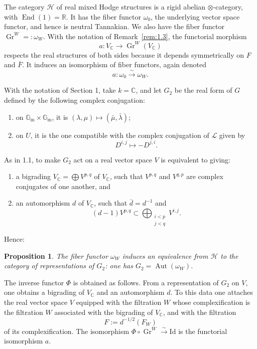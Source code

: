 \documentclass[12pt,a4paper]{article}
\theoremstyle{plain}
\newtheorem{proposition}[lemma]{Proposition}
\theoremstyle{definition}
\DeclareMathOperator{\Gr}{Gr}
\DeclareMathOperator{\Aut}{Aut}
\DeclareMathOperator{\End}{End}
\newcommand{\Gm}{\mathbb{G}_\mathrm{m}}
\newcommand{\C}{\mathbb{C}}
\newcommand{\R}{\mathbb{R}}
\begin{document}
The category $\mathscr H$ of real mixed Hodge structures is a rigid abelian $\otimes$-category, with $\End(1)=\R$. It has the fiber functor $\omega_0$, the underlying vector space functor, and hence is neutral Tannakian. We also have the fiber functor $\Gr^W=:\omega_W$. With the notation of Remark~\ref{rem:1.3}, the functorial morphism
\[
a:V_\C\longrightarrow \Gr^W(V_\C)
\]
respects the real structures of both sides because it depends symmetrically on $F$ and $\bar F$. It induces an isomorphism of fiber functors, again denoted
\[
a:\omega_0\xrightarrow{\sim}\omega_W.
\]

With the notation of Section 1, take $k=\C$, and let $G_2$ be the real form of $G$ defined by the following complex conjugation:
\begin{enumerate}[label=\alph*)]
\item on $\Gm\times\Gm$, it is $(\lambda,\mu)\mapsto(\bar\mu,\bar\lambda)$;
\item on $U$, it is the one compatible with the complex conjugation of $\mathcal L$ given by
\[
D^{i,j}\mapsto -D^{j,i}.
\]
\end{enumerate}

As in 1.1, to make $G_2$ act on a real vector space $V$ is equivalent to giving:
\begin{enumerate}[label=\alph*)]
\item a bigrading $V_\C=\bigoplus V^{p,q}$ of $V_\C$, such that $V^{p,q}$ and $V^{q,p}$ are complex conjugates of one another, and
\item an automorphism $d$ of $V_\C$, such that $\bar d=d^{-1}$ and
\[
(d-1)V^{p,q}\subset\bigoplus_{\substack{i<p\\ j<q}}V^{i,j}.
\]
\end{enumerate}

Hence:

\begin{proposition}\label{prop:2.1}
The fiber functor $\omega_W$ induces an equivalence from $\mathscr H$ to the category of representations of $G_2$: one has $G_2=\Aut(\omega_W)$.
\end{proposition}

The inverse functor $\Phi$ is obtained as follows. From a representation of $G_2$ on $V$, one obtains a bigrading of $V_\C$ and an automorphism $d$. To this data one attaches the real vector space $V$ equipped with the filtration $W$ whose complexification is the filtration $W$ associated with the bigrading of $V_\C$, and with the filtration
\[
F:=d^{-1/2}(F_W)
\]
of its complexification. The isomorphism $\Phi\circ\Gr^W\xrightarrow{\sim}\mathrm{Id}$ is the functorial isomorphism $a$.
\end{document}
